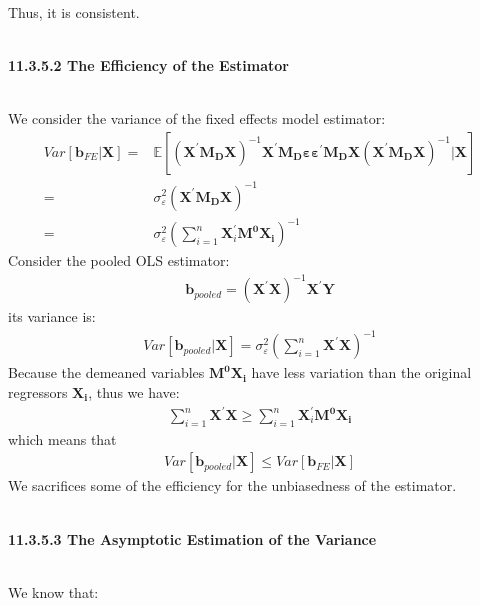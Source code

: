 \documentclass{article}
\begin{document}
Thus, it is consistent.\\\\
\centerline{\textbf{11.3.5.2 The Efficiency of the Estimator}}\\
We consider the variance of the fixed effects model estimator:
	\begin{align*}
		Var[\boldsymbol{b}_{FE} | \boldsymbol{X}] = &\mathbb{E} [(\boldsymbol{X}^\prime \boldsymbol{M_D} \boldsymbol{X})^{-1} \boldsymbol{X}^\prime \boldsymbol{M_D} \boldsymbol{\varepsilon} \boldsymbol{\varepsilon}^\prime \boldsymbol{M_D} \boldsymbol{X} (\boldsymbol{X}^\prime \boldsymbol{M_D} \boldsymbol{X})^{-1} | \boldsymbol{X}]\\ = &
		\sigma^2_{\varepsilon} (\boldsymbol{X}^\prime \boldsymbol{M_D} \boldsymbol{X})^{-1}\\ = &
		\sigma^2_{\varepsilon} (\sum^n_{i=1} \boldsymbol{X}^\prime_i \boldsymbol{M^0} \boldsymbol{X_i})^{-1} 
	\end{align*}
Consider the pooled OLS estimator:
	\begin{align*}
		\boldsymbol{b}_{pooled} = (\boldsymbol{X}^\prime \boldsymbol{X})^{-1} \boldsymbol{X}^\prime \boldsymbol{Y}
	\end{align*}
its variance is:
	\begin{align*}
		Var[\boldsymbol{b}_{pooled} | \boldsymbol{X}] = \sigma^2_{\varepsilon} (\sum^n_{i=1} \boldsymbol{X}^\prime \boldsymbol{X})^{-1}
	\end{align*}
Because the demeaned variables $\boldsymbol{M^0} \boldsymbol{X_i}$ have less variation than the original regressors $\boldsymbol{X_i}$, thus we have:
	\begin{align*}
		\sum^n_{i=1} \boldsymbol{X}^\prime \boldsymbol{X} \geq \sum^n_{i=1} \boldsymbol{X}^\prime_i \boldsymbol{M^0} \boldsymbol{X_i} 
	\end{align*}
which means that
	\begin{align*}
		Var[\boldsymbol{b}_{pooled} | \boldsymbol{X}] \leq Var[\boldsymbol{b}_{FE} | \boldsymbol{X}] 
	\end{align*}
We sacrifices some of the efficiency for the unbiasedness of the estimator.\\\\
\centerline{\textbf{11.3.5.3 The Asymptotic Estimation of the Variance}}\\
We know that:
\end{document}
